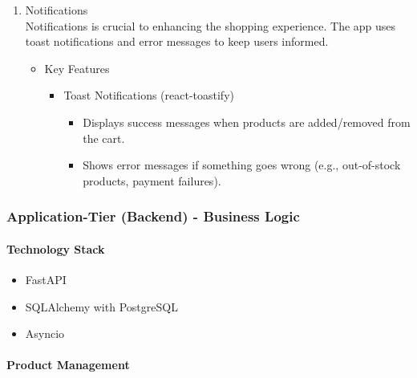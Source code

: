 \documentclass{llncs}
\begin{document}
\begin{enumerate}
        \item Notifications\\
        Notifications is crucial to enhancing the shopping experience. The app uses toast notifications and error messages to keep users informed.
            \begin{itemize}
                \item Key Features 
                \begin{itemize}
                    \item Toast Notifications (react-toastify)
                    \begin{itemize}
                        \item Displays success messages when products are added/removed from the cart.
                        \item Shows error messages if something goes wrong (e.g., out-of-stock products, payment failures).\\
                    \end{itemize}
                \end{itemize}
            \end{itemize}
    \end{enumerate}
    
\subsubsection{Application-Tier (Backend) - Business Logic}
\paragraph{Technology Stack}
    \begin{itemize}
        \item FastAPI
        \item SQLAlchemy with PostgreSQL
        \item Asyncio
    \end{itemize}

\paragraph{Product Management} \leavevmode
\end{document}
